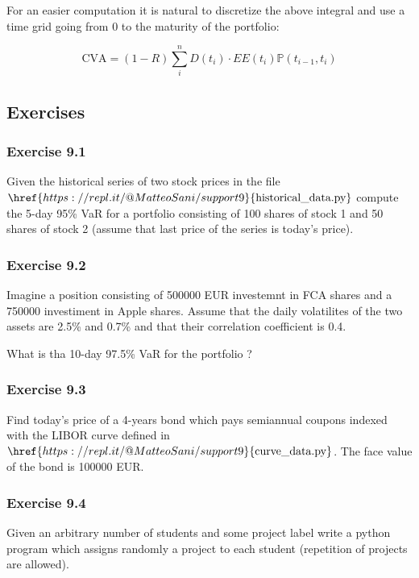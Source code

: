 For an easier computation it is natural to discretize the above integral
and use a time grid going from 0 to the maturity of the portfolio:

\[ \text{CVA} = (1-R) \sum_i^n D(t_i) \cdot EE(t_i) \mathbb{P}(t_{i-1}, t_i) \]

\subsection{Exercises}\label{exercises}

\hypertarget{exercise-9.1}{%
\subsubsection{Exercise 9.1}\label{exercise-9.1}}

Given the historical series of two stock prices in the file
\(\href{https://repl.it/@MatteoSani/support9}{\textrm{historical\_data.py}}\)
compute the 5-day 95\% VaR for a portfolio consisting of 100 shares of
stock 1 and 50 shares of stock 2 (assume that last price of the series
is today's price).

\hypertarget{exercise-9.2}{%
\subsubsection{Exercise 9.2}\label{exercise-9.2}}

Imagine a position consisting of 500000 EUR investemnt in FCA shares and
a 750000 investiment in Apple shares. Assume that the daily volatilites
of the two assets are 2.5\% and 0.7\% and that their correlation
coefficient is 0.4.

What is tha 10-day 97.5\% VaR for the portfolio ?

\hypertarget{exercise-9.3}{%
\subsubsection{Exercise 9.3}\label{exercise-9.3}}
Find today's price of a 4-years bond which pays semiannual coupons indexed with the LIBOR curve defined in \(\href{https://repl.it/@MatteoSani/support9}{\textrm{curve\_data.py}}\). The face value of the bond is 100000 EUR.

\hypertarget{exercise-9.4}{%
\subsubsection{Exercise 9.4}\label{exercise-9.4}}

Given an arbitrary number of students and some project label
write a python program which assigns randomly a project to each student
(repetition of projects are allowed).
